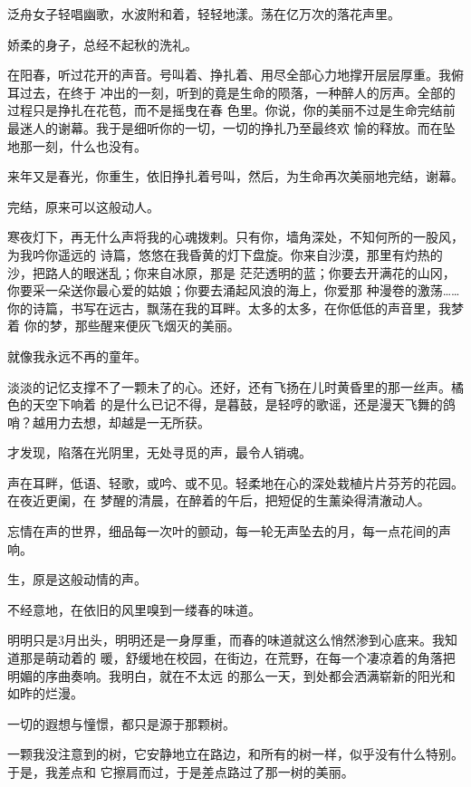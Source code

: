 \documentclass[12pt,a4paper]{article}
\begin{document}
		泛舟女子轻唱幽歌，水波附和着，轻轻地漾。荡在亿万次的落花声里。

		娇柔的身子，总经不起秋的洗礼。

		在阳春，听过花开的声音。号叫着、挣扎着、用尽全部心力地撑开层层厚重。我俯耳过去，在终于
	冲出的一刻，听到的竟是生命的陨落，一种醉人的厉声。全部的过程只是挣扎在花苞，而不是摇曳在春
	色里。你说，你的美丽不过是生命完结前最迷人的谢幕。我于是细听你的一切，一切的挣扎乃至最终欢
	愉的释放。而在坠地那一刻，什么也没有。

		来年又是春光，你重生，依旧挣扎着号叫，然后，为生命再次美丽地完结，谢幕。

		完结，原来可以这般动人。

		寒夜灯下，再无什么声将我的心魂拨剌。只有你，墙角深处，不知何所的一股风，为我吟你遥远的
	诗篇，悠悠在我昏黄的灯下盘旋。你来自沙漠，那里有灼热的沙，把路人的眼迷乱；你来自冰原，那是
	茫茫透明的蓝；你要去开满花的山冈，你要采一朵送你最心爱的姑娘；你要去涌起风浪的海上，你爱那
	种漫卷的激荡…… 你的诗篇，书写在远古，飘荡在我的耳畔。太多的太多，在你低低的声音里，我梦着
	你的梦，那些醒来便灰飞烟灭的美丽。

		就像我永远不再的童年。

		淡淡的记忆支撑不了一颗未了的心。还好，还有飞扬在儿时黄昏里的那一丝声。橘色的天空下响着
	的是什么已记不得，是暮鼓，是轻哼的歌谣，还是漫天飞舞的鸽哨？越用力去想，却越是一无所获。

		才发现，陷落在光阴里，无处寻觅的声，最令人销魂。

		声在耳畔，低语、轻歌，或吟、或不见。轻柔地在心的深处栽植片片芬芳的花园。在夜近更阑，在
	梦醒的清晨，在醉着的午后，把短促的生薰染得清澈动人。

		忘情在声的世界，细品每一次叶的颤动，每一轮无声坠去的月，每一点花间的声响。

		生，原是这般动情的声。

	\endwriting



		不经意地，在依旧的风里嗅到一缕春的味道。

		明明只是3月出头，明明还是一身厚重，而春的味道就这么悄然渗到心底来。我知道那是萌动着的
	暖，舒缓地在校园，在街边，在荒野，在每一个凄凉着的角落把明媚的序曲奏响。我明白，就在不太远
	的那么一天，到处都会洒满崭新的阳光和如昨的烂漫。

		一切的遐想与憧憬，都只是源于那颗树。

		一颗我没注意到的树，它安静地立在路边，和所有的树一样，似乎没有什么特别。于是，我差点和
	它擦肩而过，于是差点路过了那一树的美丽。
\end{document}
